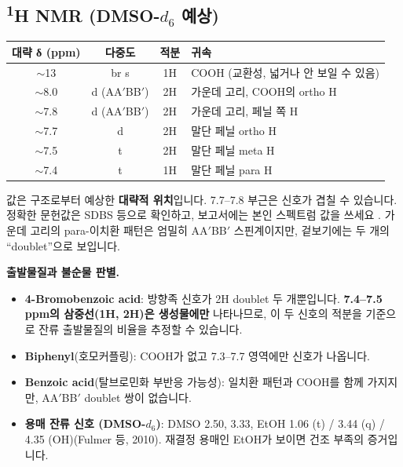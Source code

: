 \documentclass[10pt,a4paper]{article}
\begin{document}
\subsection*{\textsuperscript{1}H NMR (DMSO-$d_6$ 예상)}
\begin{center}
\renewcommand{\arraystretch}{1.15}
\begin{tabularx}{\linewidth}{|c|c|c|X|}
\hline
\textbf{대략 δ (ppm)} & \textbf{다중도} & \textbf{적분} & \textbf{귀속} \\ \hline
$\sim$13 & br s & 1H & COOH (교환성, 넓거나 안 보일 수 있음) \\ \hline
$\sim$8.0 & d (AA$'$BB$'$) & 2H & 가운데 고리, COOH의 ortho H \\ \hline
$\sim$7.8 & d (AA$'$BB$'$) & 2H & 가운데 고리, 페닐 쪽 H \\ \hline
$\sim$7.7 & d & 2H & 말단 페닐 ortho H \\ \hline
$\sim$7.5 & t & 2H & 말단 페닐 meta H \\ \hline
$\sim$7.4 & t & 1H & 말단 페닐 para H \\ \hline
\end{tabularx}
\renewcommand{\arraystretch}{1}
\end{center}
{\small 값은 구조로부터 예상한 \textbf{대략적 위치}입니다. 7.7--7.8 부근은 신호가 겹칠 수 있습니다. 정확한 문헌값은 SDBS 등으로 확인하고, 보고서에는 본인 스펙트럼 값을 쓰세요 . 가운데 고리의 para-이치환 패턴은 엄밀히 AA$'$BB$'$ 스핀계이지만, 겉보기에는 두 개의 ``doublet''으로 보입니다.}

\textbf{출발물질과 불순물 판별.}
\begin{itemize}[leftmargin=5mm,itemsep=0.5mm,topsep=0.5mm]
\item \textbf{4-Bromobenzoic acid}: 방향족 신호가 2H doublet 두 개뿐입니다. \textbf{7.4--7.5 ppm의 삼중선(1H, 2H)은 생성물에만} 나타나므로, 이 두 신호의 적분을 기준으로 잔류 출발물질의 비율을 추정할 수 있습니다.
\item \textbf{Biphenyl}(호모커플링): COOH가 없고 7.3--7.7 영역에만 신호가 나옵니다.
\item \textbf{Benzoic acid}(탈브로민화 부반응 가능성): 일치환 패턴과 COOH를 함께 가지지만, AA$'$BB$'$ doublet 쌍이 없습니다.
\item \textbf{용매 잔류 신호 (DMSO-$d_6$)}: DMSO 2.50,  3.33, EtOH 1.06 (t) / 3.44 (q) / 4.35 (OH)(Fulmer 등, 2010). 재결정 용매인 EtOH가 보이면 건조 부족의 증거입니다.
\end{itemize}

\end{document}
